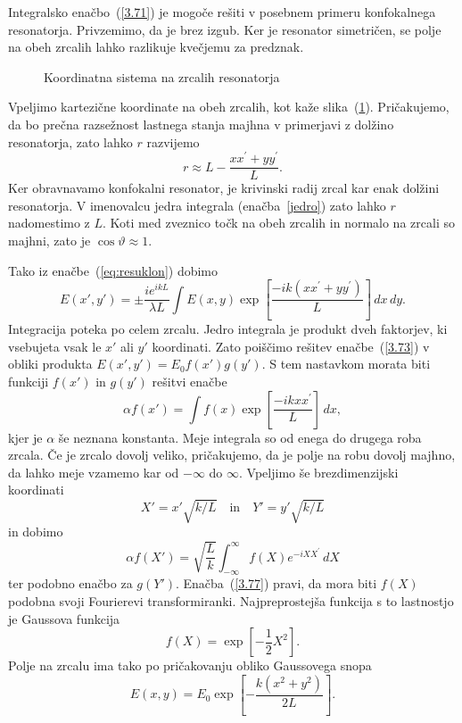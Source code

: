 Integralsko enačbo~(\ref{3.71}) je mogoče rešiti v posebnem primeru
konfokalnega resonatorja. Privzemimo, da je brez izgub. 
Ker je resonator simetričen, se polje na obeh zrcalih lahko razlikuje kvečjemu
za predznak.
\begin{figure}[h]
\centering
\def\svgwidth{90truemm} 

\caption{Koordinatna sistema na zrcalih resonatorja}
\label{fig:uklon_res_shema}
\end{figure}
Vpeljimo kartezične koordinate na obeh zrcalih, kot kaže slika~(\ref{fig:uklon_res_shema}).
Pričakujemo, da bo prečna razsežnost lastnega stanja majhna v primerjavi
z dolžino resonatorja, zato lahko $r$ razvijemo 
\begin{equation}
r\approx L-\frac{xx^{\prime}+yy^{\prime}}{L}.
\label{3.72}
\end{equation}
Ker obravnavamo konfokalni resonator, je krivinski radij zrcal kar enak dolžini resonatorja.
V imenovalcu jedra integrala (enačba~\ref{jedro}) zato lahko $r$ nadomestimo
z $L$. Koti med zveznico točk na obeh zrcalih in normalo na zrcali
so majhni, zato je  $\cos\vartheta \approx 1$. 

Tako iz enačbe~(\ref{eq:resuklon})
dobimo 
\begin{equation}
E(x',y')=\pm\frac{ie^{ikL}}{\lambda L}\int E(x,y)\exp
\left[\frac{-ik(xx^{\prime}+yy^{\prime})}{L}\right]\, dx\, dy.
\label{3.73}
\end{equation}
Integracija poteka po celem zrcalu. Jedro integrala je produkt dveh
faktorjev, ki vsebujeta vsak le $x'$ ali $y'$ koordinati. Zato poiščimo
rešitev enačbe~(\ref{3.73}) v obliki produkta 
$
E(x',y')=E_{0}f(x')g(y').
$
S tem nastavkom morata biti funkciji $f(x')$ in $g(y')$ rešitvi enačbe
\begin{equation}
\alpha f(x')=\int f(x)\exp\left[\frac{-ikxx^{\prime}}{L}\right]\, dx,
\label{3.75}
\end{equation}
kjer je $\alpha$ še neznana konstanta. Meje integrala so od enega do 
drugega roba zrcala. Če je zrcalo dovolj veliko,
pričakujemo, da je polje na robu dovolj majhno, da lahko meje vzamemo
kar od $-\infty$ do $\infty$. Vpeljimo še brezdimenzijski koordinati
\begin{equation}
X'=x'\sqrt{k/L} \quad \mathrm{in} \quad Y'=y'\sqrt{k/L}
\label{3.76}
\end{equation}
in dobimo
\begin{equation}
\alpha f(X')=\sqrt{\frac{L}{k}}\int_{-\infty}^{\infty}f(X)e^{-iXX^{\prime}}\, dX
\label{3.77}
\end{equation}
ter podobno enačbo za $g(Y')$. Enačba~(\ref{3.77}) pravi, da mora
biti $f(X)$ podobna svoji Fourierevi transformiranki. Najpreprostejša
funkcija s to lastnostjo je Gaussova funkcija 
\begin{equation}
f(X)=\exp[-\frac{1}{2}X^{2}].
\label{3.78}
\end{equation}
Polje na zrcalu ima tako po pričakovanju obliko Gaussovega snopa
\begin{equation}
E(x,y)=E_{0}\exp\left[-\frac{k(x^{2}+y^{2})}{2L}\right].
\label{3.79}
\end{equation}

